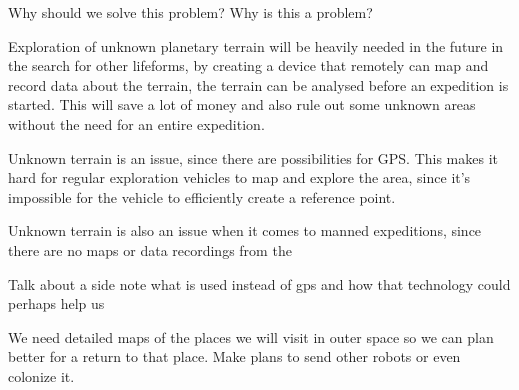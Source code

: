 Why should we solve this problem? Why is this a problem?

Exploration of unknown planetary terrain will be heavily needed in the future in the search for other lifeforms, by creating a device that remotely can map and record data about the terrain, the terrain can be analysed before an expedition is started. This will save a lot of money and also rule out some unknown areas without the need for an entire expedition.

Unknown terrain is an issue, since there are possibilities for GPS. This makes it hard for regular exploration vehicles to map and explore the area, since it's impossible for the vehicle to efficiently create a reference point.

Unknown terrain is also an issue when it comes to manned expeditions, since there are no maps or data recordings from the






Talk about a side note what is used instead of gps and how that technology could perhaps help us

We need detailed maps of the places we will visit in outer space so we can plan better for a return to that place. Make plans to send other robots or even colonize it.




